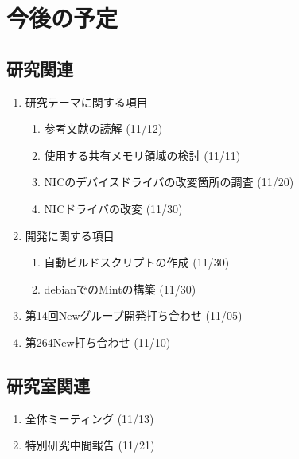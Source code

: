 \documentclass[fleqn, 14pt]{extarticle}
\begin{document}
\section{今後の予定}
\label{sec-4}
\subsection{研究関連}
\label{sec-4-1}

\begin{enumerate}
\item 研究テーマに関する項目
\hfill
\begin{enumerate}


\item 参考文献の読解
\hfill
(11/12)

\item 使用する共有メモリ領域の検討
\hfill
(11/11)

\item NICのデバイスドライバの改変箇所の調査
\hfill
(11/20)

\item NICドライバの改変
\hfill
(11/30)

\end{enumerate}
\item 開発に関する項目
\hfill
\begin{enumerate}

\item 自動ビルドスクリプトの作成
\hfill
(11/30)

\item debianでのMintの構築
\hfill
(11/30)

\end{enumerate}
\item 第14回Newグループ開発打ち合わせ
\hfill
\label{enum-7}
(11/05)
\item 第264New打ち合わせ
\hfill
\label{enum-8}
(11/10)
\end{enumerate}

\subsection{研究室関連}
\label{sec-4-2}

\begin{enumerate}

\item 全体ミーティング
\hfill
\label{enum-10}
(11/13)
\item 特別研究中間報告
\hfill
\label{enum-11}
(11/21)
\end{enumerate}
\end{document}
